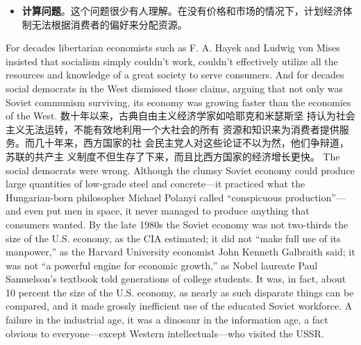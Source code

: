 \begin{paracol}{2}
\begin{itemize}
\end{itemize}
\switchcolumn
\begin{itemize}
	\item \textbf{计算问题}。这个问题很少有人理解。在没有价格和市场的情况下，计划经济体制无法根据消费者的偏好来分配资源。
\end{itemize}
\switchcolumn*
For decades libertarian economists such as F. A. Hayek and
Ludwig von Mises insisted that socialism simply couldn't work,
couldn't effectively utilize all the resources and knowledge of a
great society to serve consumers. And for decades social democrats in the West dismissed those claims, arguing that not only
was Soviet communism surviving, its economy was growing
faster than the economies of the West.
\switchcolumn
数十年以来，古典自由主义经济学家如哈耶克和米瑟斯坚
持认为社会主义无法运转，不能有效地利用一个大社会的所有
资源和知识来为消费者提供服务。而几十年来，西方国家的社
会民主党人对这些论证不以为然，他们争辩道，苏联的共产主
义制度不但生存了下来，而且比西方国家的经济增长更快。
\switchcolumn*
The social democrats were wrong. Although the clumsy Soviet economy could produce large quantities of low-grade steel and concrete---it practiced what the Hungarian-born philosopher Michael Polanyi called ``conspicuous production''---and even put men in space, it never managed to produce anything
that consumers wanted. By the late 1980s the Soviet economy
was not two-thirds the size of the U.S. economy, as the CIA estimated; it did not ``make full use of its manpower,'' as the Harvard University economist John Kenneth Galbraith said; it was
not ``a powerful engine for economic growth,'' as Nobel laureate Paul Samuelson's textbook told generations of college students. It was, in fact, about 10 percent the size of the U.S. economy, as
nearly as such disparate things can be compared, and it made
grossly inefficient use of the educated Soviet workforce. A failure in the industrial age, it was a dinosaur in the information age, a fact obvious to everyone---except Western intellectuals---who visited the USSR.


\end{paracol}

